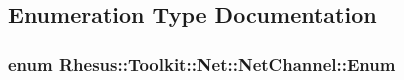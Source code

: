 \subsection{Enumeration Type Documentation}
\hypertarget{namespace_rhesus_1_1_toolkit_1_1_net_1_1_net_channel_acf0293f3b2ad1085b27f1d7feff35033}{
\subsubsection[{Enum}]{\setlength{\rightskip}{0pt plus 5cm}enum {\bf Rhesus\-::\-Toolkit\-::\-Net\-::\-Net\-Channel\-::\-Enum}}}\label{namespace_rhesus_1_1_toolkit_1_1_net_1_1_net_channel_acf0293f3b2ad1085b27f1d7feff35033}
